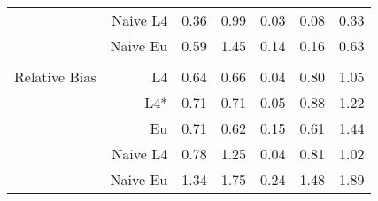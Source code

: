 \documentclass[a4paper,12pt,twoside]{book}
\begin{document}
\begin{table}[H]
\begin{tabular}{crrrrrr}
&Naive L4&  
  0.36 & 0.99 & 0.03 & 0.08 & 0.33 \\ 
   
&Naive Eu &  0.59 & 1.45 & 0.14 & 0.16 & 0.63 \\ \\
  
   \hline
   
{\color{blue} Relative Bias } & L4  &0.64 & 0.66 & 0.04 & 0.80 & 1.05 \\ 
 
&L4*  & 0.71 & 0.71 & 0.05 & 0.88 & 1.22 \\ 
  
  
&Eu &  
  0.71 & 0.62 & 0.15 & 0.61 & 1.44 \\ 
  
 
&Naive L4&  
  
  0.78 & 1.25 & 0.04 & 0.81 & 1.02 \\ 
  
  
  
&Naive Eu &  
 1.34 & 1.75 & 0.24 & 1.48 & 1.89 \\ 
 
\end{tabular}

\end{table}
\end{document}
